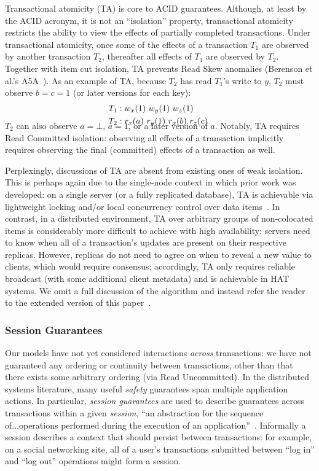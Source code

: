 Transactional atomicity (TA) is core to ACID guarantees. Although, at
least by the ACID acronym, it is not an ``isolation'' property,
transactional atomicity restricts the ability to view the effects of
partially completed transactions. Under transactional atomicity, once
some of the effects of a transaction $T_1$ are observed by another
transaction $T_2$, thereafter all effects of $T_1$ are observed by
$T_2$. Together with item cut isolation, TA prevents Read Skew
anomalies (Berenson et al.'s A5A~\cite{ansicritique}). As an example
of TA, because $T_2$ has read $T_1$'s write to $y$, $T_2$ must observe
$b=c=1$ (or later versions for each key):
\vspace{-.5em}
\begin{align*}
\small
T_1 &: w_x(1)~w_y(1)~w_z(1)
\\T_2 &: r_x(a)~r_y(1)~r_x(b)~r_z(c)~\\[-1.5em]
\end{align*}
$T_2$ can also observe $a=\bot$, $a=1$, or a later version of
$a$. Notably, TA requires Read Committed isolation: observing all
effects of a transaction implicitly requires observing the final
(committed) effects of a transaction as well.

Perplexingly, discussions of TA are absent from existing ones of
weak isolation. This is perhaps again due to the single-node
context in which prior work was developed: on a single server (or a
fully replicated database), TA is achievable via lightweight locking
and/or local concurrency control over data items~\cite{gstore}. In
contrast, in a distributed environment, TA over arbitrary groups of
non-colocated items is considerably more difficult to achieve with
high availability: servers need to know when all of a transaction's
updates are present on their respective replicas. However, replicas do
not need to agree on when to reveal a new value to clients, which
would require consensus; accordingly, TA only requires reliable
broadcast (with some additional client metadata) and is
achievable in HAT systems. We omit a full discussion of the algorithm
and instead refer the reader to the extended version of this
paper~\cite{hat-tr}.  

\subsubsection{Session Guarantees}

Our models have not yet considered interactions \textit{across}
transactions: we have not guaranteed any ordering or continuity
between transactions, other than that there exists some arbitrary
ordering (via Read Uncommitted). In the distributed systems
literature, many useful \textit{safety} guarantees span multiple
application actions. In particular, \textit{session guarantees} are
used to describe guarantees across transactions within a given
\textit{session}, ``an abstraction for the sequence of...operations
performed during the execution of an
application''~\cite{sessionguarantees}. Informally a session describes
a context that should persist between transactions: for example, on a
social networking site, all of a user's transactions submitted between
``log in'' and ``log out'' operations might form a session.

